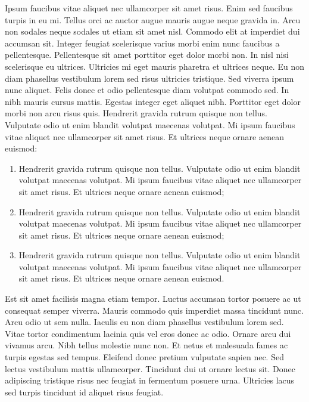 \documentclass[11pt]{article}
\begin{document}
\par Ipsum faucibus vitae aliquet nec ullamcorper sit amet risus. Enim sed faucibus turpis in eu mi. Tellus orci ac auctor augue mauris augue neque gravida in. Arcu non sodales neque sodales ut etiam sit amet nisl. Commodo elit at imperdiet dui accumsan sit. Integer feugiat scelerisque varius morbi enim nunc faucibus a pellentesque. Pellentesque sit amet porttitor eget dolor morbi non. In nisl nisi scelerisque eu ultrices. Ultricies mi eget mauris pharetra et ultrices neque. Eu non diam phasellus vestibulum lorem sed risus ultricies tristique. Sed viverra ipsum nunc aliquet. Felis donec et odio pellentesque diam volutpat commodo sed. In nibh mauris cursus mattis. Egestas integer eget aliquet nibh. Porttitor eget dolor morbi non arcu risus quis. Hendrerit gravida rutrum quisque non tellus. Vulputate odio ut enim blandit volutpat maecenas volutpat. Mi ipsum faucibus vitae aliquet nec ullamcorper sit amet risus. Et ultrices neque ornare aenean euismod:
\begin{enumerate}
  \item Hendrerit gravida rutrum quisque non tellus. Vulputate odio ut enim blandit volutpat maecenas volutpat. Mi ipsum faucibus vitae aliquet nec ullamcorper sit amet risus. Et ultrices neque ornare aenean euismod;
  \item Hendrerit gravida rutrum quisque non tellus. Vulputate odio ut enim blandit volutpat maecenas volutpat. Mi ipsum faucibus vitae aliquet nec ullamcorper sit amet risus. Et ultrices neque ornare aenean euismod;
  \item Hendrerit gravida rutrum quisque non tellus. Vulputate odio ut enim blandit volutpat maecenas volutpat. Mi ipsum faucibus vitae aliquet nec ullamcorper sit amet risus. Et ultrices neque ornare aenean euismod.
\end{enumerate}

\par Est sit amet facilisis magna etiam tempor. Luctus accumsan tortor posuere ac ut consequat semper viverra. Mauris commodo quis imperdiet massa tincidunt nunc. Arcu odio ut sem nulla. Iaculis eu non diam phasellus vestibulum lorem sed. Vitae tortor condimentum lacinia quis vel eros donec ac odio. Ornare arcu dui vivamus arcu. Nibh tellus molestie nunc non. Et netus et malesuada fames ac turpis egestas sed tempus. Eleifend donec pretium vulputate sapien nec. Sed lectus vestibulum mattis ullamcorper. Tincidunt dui ut ornare lectus sit. Donec adipiscing tristique risus nec feugiat in fermentum posuere urna. Ultricies lacus sed turpis tincidunt id aliquet risus feugiat. 
\end{document}
